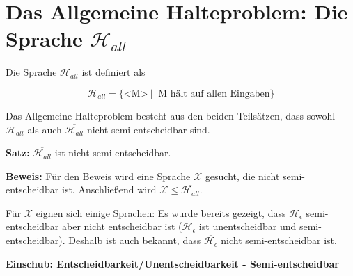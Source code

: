 \documentclass{scrartcl}%
\begin{document}

    \section*{Das Allgemeine Halteproblem: Die Sprache $\mathcal{H}_{all}$}
    Die Sprache $\mathcal{H}_{all}$ ist definiert als

    \begin{equation*}
        \mathcal{H}_{all} = \{ \text{<M>}\ |\ \text{ M hält auf allen Eingaben} \}
    \end{equation*}

    Das Allgemeine Halteproblem besteht aus den beiden Teilsätzen,
    dass sowohl $\mathcal{H}_{all}$ als auch $\overline{\mathcal{H}_{all}}$ nicht semi-entscheidbar sind.

    \vspace*{1cm}
    \textbf{\textsf{Satz:}} $\overline{\mathcal{H}_{all}}$ ist nicht semi-entscheidbar.

    \vspace*{0.3cm}
    \textbf{\textsf{Beweis:}} Für den Beweis wird eine Sprache $\mathcal{X}$ gesucht, die nicht semi-entscheidbar ist.
    Anschließend wird  $\mathcal{X} \leq \overline{\mathcal{H}_{all}}$.

    Für $\mathcal{X}$ eignen sich einige Sprachen: Es wurde bereits gezeigt, dass $\mathcal{H}_\epsilon$ semi-entscheidbar aber nicht entscheidbar ist ($\mathcal{H}_\epsilon$ ist unentscheidbar und semi-entscheidbar).
    Deshalb ist auch bekannt, dass $\overline{\mathcal{H}_\epsilon}$ nicht semi-entscheidbar ist.

    \vspace*{0.5cm}
    \par
    \begingroup
    \leftskip=1cm %
    \noindent

    \vspace*{0.3cm}
    \textbf{\textsf{Einschub: Entscheidbarkeit/Unentscheidbarkeit - Semi-entscheidbar}}

    \par
    \endgroup
    \par
    \begingroup
    \leftskip=1cm %
    \noindent
\end{document}
